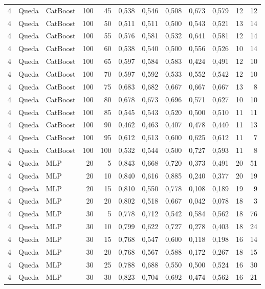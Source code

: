 \begin{longtable}{@{}rllrrrrrrrrr@{}}
4 & Queda & CatBoost & 100 & 45 & 0,538 & 0,546 & 0,508 & 0,673 & 0,579 & 12 & 12 \\
4 & Queda & CatBoost & 100 & 50 & 0,511 & 0,511 & 0,500 & 0,543 & 0,521 & 13 & 14 \\
4 & Queda & CatBoost & 100 & 55 & 0,576 & 0,581 & 0,532 & 0,641 & 0,581 & 12 & 14 \\
4 & Queda & CatBoost & 100 & 60 & 0,538 & 0,540 & 0,500 & 0,556 & 0,526 & 10 & 14 \\
4 & Queda & CatBoost & 100 & 65 & 0,597 & 0,584 & 0,583 & 0,424 & 0,491 & 12 & 10 \\
4 & Queda & CatBoost & 100 & 70 & 0,597 & 0,592 & 0,533 & 0,552 & 0,542 & 12 & 10 \\
4 & Queda & CatBoost & 100 & 75 & 0,683 & 0,682 & 0,667 & 0,667 & 0,667 & 13 & 8 \\
4 & Queda & CatBoost & 100 & 80 & 0,678 & 0,673 & 0,696 & 0,571 & 0,627 & 10 & 10 \\
4 & Queda & CatBoost & 100 & 85 & 0,545 & 0,543 & 0,520 & 0,500 & 0,510 & 11 & 11 \\
4 & Queda & CatBoost & 100 & 90 & 0,462 & 0,463 & 0,407 & 0,478 & 0,440 & 11 & 13 \\
4 & Queda & CatBoost & 100 & 95 & 0,612 & 0,613 & 0,600 & 0,625 & 0,612 & 11 & 7 \\
4 & Queda & CatBoost & 100 & 100 & 0,532 & 0,544 & 0,500 & 0,727 & 0,593 & 11 & 8 \\
4 & Queda & MLP & 20 & 5 & 0,843 & 0,668 & 0,720 & 0,373 & 0,491 & 20 & 51 \\
4 & Queda & MLP & 20 & 10 & 0,840 & 0,616 & 0,885 & 0,240 & 0,377 & 20 & 19 \\
4 & Queda & MLP & 20 & 15 & 0,810 & 0,550 & 0,778 & 0,108 & 0,189 & 19 & 9 \\
4 & Queda & MLP & 20 & 20 & 0,802 & 0,518 & 0,667 & 0,042 & 0,078 & 18 & 3 \\
4 & Queda & MLP & 30 & 5 & 0,778 & 0,712 & 0,542 & 0,584 & 0,562 & 18 & 76 \\
4 & Queda & MLP & 30 & 10 & 0,799 & 0,622 & 0,727 & 0,278 & 0,403 & 18 & 24 \\
4 & Queda & MLP & 30 & 15 & 0,768 & 0,547 & 0,600 & 0,118 & 0,198 & 16 & 14 \\
4 & Queda & MLP & 30 & 20 & 0,768 & 0,567 & 0,588 & 0,172 & 0,267 & 18 & 15 \\
4 & Queda & MLP & 30 & 25 & 0,788 & 0,688 & 0,550 & 0,500 & 0,524 & 16 & 30 \\
4 & Queda & MLP & 30 & 30 & 0,823 & 0,704 & 0,692 & 0,474 & 0,562 & 16 & 21 \\

\end{longtable}
